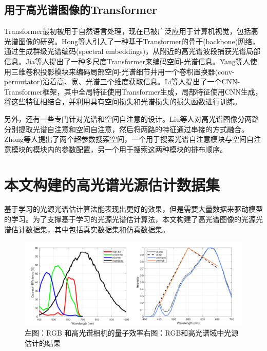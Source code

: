 \documentclass[
    type = master, %
    degree = academic,        %
    decl-page,  %
  ]{njuthesis}
\begin{document}
\subsection{用于高光谱图像的Transformer}
Transformer最初被用于自然语言处理\cite{vaswani2017attention}，现在已被广泛应用于计算机视觉，包括高光谱图像的研究。Hong等人\cite{TRS8}引入了一种基于Transformer的骨干(backbone)网络，通过生成群级光谱编码(spectral embeddings)，从附近的高光谱波段捕获光谱局部信息。Jia等人\cite{TRS12}提出了一种多尺度Transformer来编码空间-光谱信息。Yang等人\cite{TRS11}使用三维卷积投影模块来编码局部空间-光谱细节并用一个卷积置换器(conv-permutator)沿着高、宽、光谱三个维度获取信息。Li等人\cite{TRS122}提出了一个CNN-Transformer框架，其中全局特征使用Transformer生成，局部特征使用CNN生成，将这些特征相结合，并利用具有空间损失和光谱损失的损失函数进行训练。

另外，还有一些专门针对光谱和空间自注意的设计。Liu等人\cite{TRS9}对高光谱图像分两路分别提取光谱自注意和空间自注意，然后将两路的特征通过串接的方式融合。Zhong等人\cite{TRS115}提出了两个超参数搜索空间，一个用于搜索光谱自注意模块与空间自注意模块的模块内的参数配置，另一个用于搜索这两种模块的排布顺序。

\section{本文构建的高光谱光源估计数据集}
基于学习的光源光谱估计算法能表现出更好的效果，但是需要大量数据来驱动模型的学习。为了支撑基于学习的光源光谱估计算法，本文构建了高光谱图像的光源光谱估计数据集，其中包括真实数据集和仿真数据集。

\begin{figure}[h]
	\begin{center}
		\includegraphics[width=1.0\linewidth]{docs/fig-chap2/fig-2-spec-rgb-compare.pdf}
	\end{center}
	\caption{左图：RGB 和高光谱相机的量子效率\quad 右图：RGB和高光谱域中光源估计的结果}
        \label{fig:spec-rgb}
\end{figure}
\end{document}
